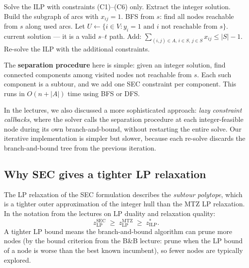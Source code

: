 \documentclass[12pt, a4paper]{article}
\begin{document}
\begin{algorithm}[H]
\caption{Iterative SEC generation}
\begin{algorithmic}[1]
\State Solve the ILP with constraints (C1)--(C6) only.
\Loop
  \State Extract the integer solution. Build the subgraph of arcs with $x_{ij} = 1$.
  \State BFS from $s$: find all nodes reachable from $s$ along used arcs.
  \State Let $U \leftarrow \{i \in V : y_i = 1 \text{ and } i \text{ not reachable
         from } s\}$.
    \State \Return current solution --- it is a valid $s$--$t$ path.
  \EndIf
    \State Add: $\displaystyle\sum_{(i,j) \in A,\, i \in S,\, j \in S}
           x_{ij} \leq |S| - 1$.
  \EndFor
  \State Re-solve the ILP with the additional constraints.
\EndLoop
\end{algorithmic}
\end{algorithm}

The \textbf{separation procedure} here is simple: given an integer solution, find
connected components among visited nodes not reachable from $s$. Each such component
is a subtour, and we add one SEC constraint per component. This runs in $O(n + |A|)$
time using BFS or DFS.

In the lectures, we also discussed a more sophisticated approach:
\emph{lazy constraint callbacks}, where the solver calls the separation procedure at
each integer-feasible node during its own branch-and-bound, without restarting the
entire solve. Our iterative implementation is simpler but slower, because each
re-solve discards the branch-and-bound tree from the previous iteration.

\subsection{Why SEC gives a tighter LP relaxation}

The LP relaxation of the SEC formulation describes the \emph{subtour polytope}, which
is a tighter outer approximation of the integer hull than the MTZ LP relaxation. In
the notation from the lectures on LP duality and relaxation quality:
\[
  z_{\mathrm{LP}}^{\mathrm{SEC}} \;\geq\; z_{\mathrm{LP}}^{\mathrm{MTZ}}
  \;\geq\; z_{\mathrm{ILP}}^*.
\]
A tighter LP bound means the branch-and-bound algorithm can prune more nodes (by the
bound criterion from the B\&B lecture: prune when the LP bound of a node is worse than
the best known incumbent), so fewer nodes are typically explored.
\end{document}
